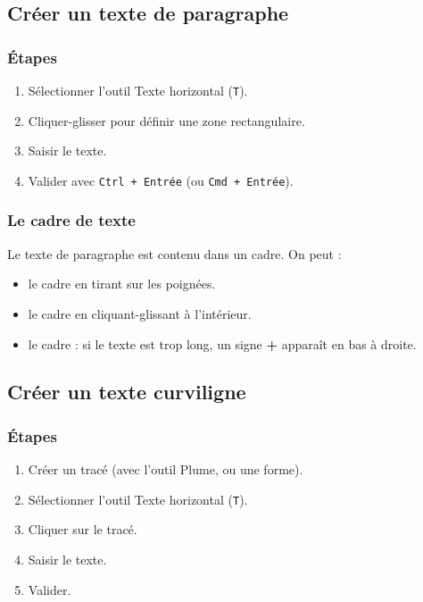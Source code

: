 \subsection{Créer un texte de paragraphe}

\subsubsection{Étapes}

\begin{enumerate}
    \item Sélectionner l'outil Texte horizontal (\texttt{T}).
    \item Cliquer-glisser pour définir une zone rectangulaire.
    \item Saisir le texte.
    \item Valider avec \texttt{Ctrl + Entrée} (ou \texttt{Cmd + Entrée}).
\end{enumerate}

\subsubsection{Le cadre de texte}

Le texte de paragraphe est contenu dans un cadre. On peut :

\begin{itemize}
    \item {} le cadre en tirant sur les poignées.
    \item {} le cadre en cliquant-glissant à l'intérieur.
    \item {} le cadre : si le texte est trop long, un signe \textbf{+} apparaît en bas à droite.
\end{itemize}

\subsection{Créer un texte curviligne}

\subsubsection{Étapes}

\begin{enumerate}
    \item Créer un tracé (avec l'outil Plume, ou une forme).
    \item Sélectionner l'outil Texte horizontal (\texttt{T}).
    \item Cliquer sur le tracé.
    \item Saisir le texte.
    \item Valider.
\end{enumerate}

